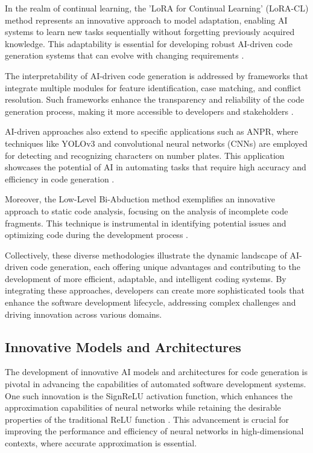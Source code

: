 In the realm of continual learning, the 'LoRA for Continual Learning' (LoRA-CL) method represents an innovative approach to model adaptation, enabling AI systems to learn new tasks sequentially without forgetting previously acquired knowledge. This adaptability is essential for developing robust AI-driven code generation systems that can evolve with changing requirements \cite{chitale2023taskarithmeticloracontinual}.

The interpretability of AI-driven code generation is addressed by frameworks that integrate multiple modules for feature identification, case matching, and conflict resolution. Such frameworks enhance the transparency and reliability of the code generation process, making it more accessible to developers and stakeholders \cite{lin2023interpretabilityframeworksimilarcase}.

AI-driven approaches also extend to specific applications such as ANPR, where techniques like YOLOv3 and convolutional neural networks (CNNs) are employed for detecting and recognizing characters on number plates. This application showcases the potential of AI in automating tasks that require high accuracy and efficiency in code generation \cite{adak2022automaticnumberplaterecognition}.

Moreover, the Low-Level Bi-Abduction method exemplifies an innovative approach to static code analysis, focusing on the analysis of incomplete code fragments. This technique is instrumental in identifying potential issues and optimizing code during the development process \cite{holk2022lowlevelbiabduction}.

Collectively, these diverse methodologies illustrate the dynamic landscape of AI-driven code generation, each offering unique advantages and contributing to the development of more efficient, adaptable, and intelligent coding systems. By integrating these approaches, developers can create more sophisticated tools that enhance the software development lifecycle, addressing complex challenges and driving innovation across various domains.


\subsection{Innovative Models and Architectures} \label{subsec:Innovative Models and Architectures}

The development of innovative AI models and architectures for code generation is pivotal in advancing the capabilities of automated software development systems. One such innovation is the SignReLU activation function, which enhances the approximation capabilities of neural networks while retaining the desirable properties of the traditional ReLU function \cite{li2023signreluneuralnetworkapproximation}. This advancement is crucial for improving the performance and efficiency of neural networks in high-dimensional contexts, where accurate approximation is essential.



